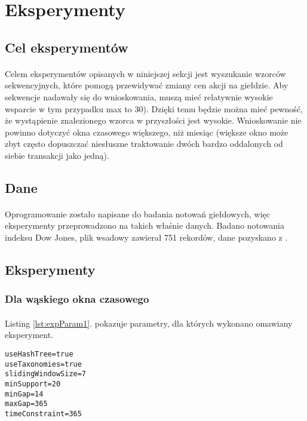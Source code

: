 \documentclass[11pt,a4paper]{article}
\begin{document}
\section{Eksperymenty}
\subsection{Cel eksperymentów}
\paragraph{}Celem eksperymentów opisanych w niniejszej sekcji jest wyszukanie wzorców sekwencyjnych, które pomogą przewidywać zmiany cen akcji na giełdzie. Aby sekwencje nadawały się do wnioskowania, muszą mieć relatywnie wysokie wsparcie w tym przypadku max to 30). Dzięki temu będzie można mieć pewność, że wystąpienie znalezionego wzorca w przyszłości jest wysokie. Wnioskowanie nie powinno dotyczyć okna czasowego większego, niż miesiąc (większe okno może zbyt często dopuszczać niesłuszne traktowanie dwóch bardzo oddalonych od siebie transakcji jako jedną).
\subsection{Dane}
\paragraph{}Oprogramowanie zostało napisane do badania notowań giełdowych, więc eksperymenty przeprowadzono na takich właśnie danych. Badano notowania indeksu Dow Jones, plik wsadowy zawierał 751 rekordów, dane pozyskano z \cite{bib:DowJones}.
\subsection{Eksperymenty}
\subsubsection{Dla wąskiego okna czasowego}
\paragraph{}Listing \ref{lst:expParam1}. pokazuje parametry, dla których wykonano omawiany eksperyment.
\begin{lstlisting}[caption={Parametry, eksperyment 1},label={lst:expParam1}]
useHashTree=true
useTaxonomies=true
slidingWindowSize=7
minSupport=20
minGap=14
maxGap=365
timeConstraint=365
\end{lstlisting}
\end{document}
